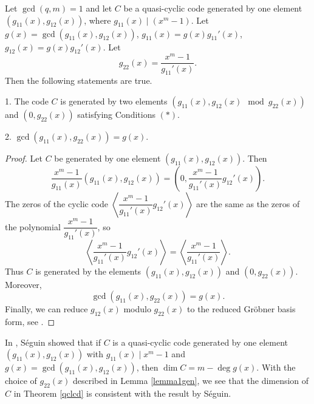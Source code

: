 \documentclass[a4paper,12pt]{article}
\begin{document}
\begin{lemma} \label{lemma1gen} 
Let $\gcd(q,m)=1$ and let $C$ be a quasi-cyclic code generated by one element $(g_{11}(x),g_{12}(x))$, where $g_{11}(x) \mid (x^m-1)$.  
Let $g(x)=\gcd(g_{11}(x),g_{12}(x))$, $g_{11}(x)=g(x)g_{11}'(x)$, $g_{12}(x)=g(x)g_{12}'(x)$. 
Let 
\[
g_{22}(x) = \dfrac{x^m-1}{g_{11}'(x)}.
\]
Then the following statements are true.

1. The code $C$ is generated by two elements $(g_{11}(x),g_{12}(x) \mod{g_{22}(x)})$ and $(0,g_{22}(x))$ satisfying Conditions  $(\ast)$.

2. $\gcd(g_{11}(x),g_{22}(x))=g(x)$.
\end{lemma}
\begin{proof}  Let $C$ be   generated by one element $(g_{11}(x),g_{12}(x))$. Then
\[
\dfrac{x^m-1}{g_{11}(x)} (g_{11}(x),g_{12}(x)) =  \left(0, \dfrac{x^m-1}{g_{11}'(x)}  g_{12}'(x)\right).
\]
The zeros of the cyclic code $\left\langle  \dfrac{x^m-1}{g_{11}'(x)}  g_{12}'(x) \right\rangle$ are the same as the zeros of the polynomial $\dfrac{x^m-1}{g_{11}'(x)}$, so 
\[
\left\langle   \dfrac{x^m-1}{g_{11}'(x)}  g_{12}'(x) \right\rangle = \left\langle  \dfrac{x^m-1}{g_{11}'(x)}\right\rangle. 
\]
Thus $C$ is generated by the elements $(g_{11}(x),g_{12}(x))$ and $(0,g_{22}(x))$. Moreover, 
\[
\gcd(g_{11}(x),g_{22}(x))=g(x).
\]
Finally,  we can reduce $g_{12}(x)$  modulo $g_{22}(x)$ to the reduced Gr\"obner basis form, see \cite{lally2001}.
\end{proof}

\begin{remark} In \cite[Lemma 1]{seguin2004}, S\'eguin showed that if  $C$ is a quasi-cyclic code generated by one element $(g_{11}(x),g_{12}(x))$ with $g_{11}(x) \mid x^m-1$ and $g(x)=\gcd(g_{11}(x),g_{12}(x))$, then  $\dim C = m-\deg g(x)$. With the choice of $g_{22}(x)$ described in Lemma \ref{lemma1gen}, we see that the dimension of $C$ in Theorem \ref{qclcd} is consistent with the result by S\'eguin. 
\end{remark}
\end{document}

